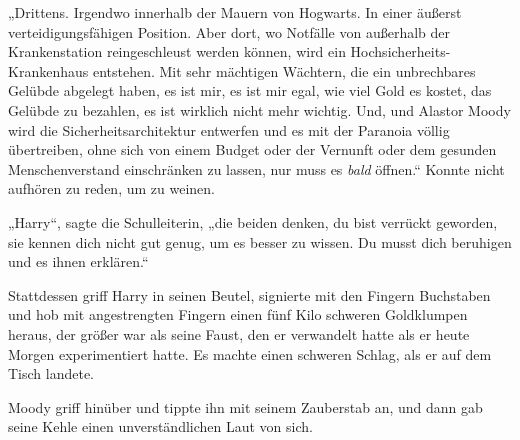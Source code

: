 „Drittens. Irgendwo innerhalb der Mauern von Hogwarts. In einer äußerst verteidigungsfähigen Position. Aber dort, wo Notfälle von außerhalb der Krankenstation reingeschleust werden können, wird ein Hochsicherheits-Krankenhaus entstehen. Mit sehr mächtigen Wächtern, die ein unbrechbares Gelübde abgelegt haben, es ist mir, es ist mir egal, wie viel Gold es kostet, das Gelübde zu bezahlen, es ist wirklich nicht mehr wichtig. Und, und Alastor Moody wird die Sicherheitsarchitektur entwerfen und es mit der Paranoia völlig übertreiben, ohne sich von einem Budget oder der Vernunft oder dem gesunden Menschenverstand einschränken zu lassen, nur muss es \emph{bald} öffnen.“ Konnte nicht aufhören zu reden, um zu weinen.

„Harry“, sagte die Schulleiterin, „die beiden denken, du bist verrückt geworden, sie kennen dich nicht gut genug, um es besser zu wissen. Du musst dich beruhigen und es ihnen erklären.“

Stattdessen griff Harry in seinen Beutel, signierte mit den Fingern Buchstaben und hob mit angestrengten Fingern einen fünf Kilo schweren Goldklumpen heraus, der größer war als seine Faust, den er verwandelt hatte als er heute Morgen experimentiert hatte. Es machte einen schweren Schlag, als er auf dem Tisch landete.

Moody griff hinüber und tippte ihn mit seinem Zauberstab an, und dann gab seine Kehle einen unverständlichen Laut von sich.


